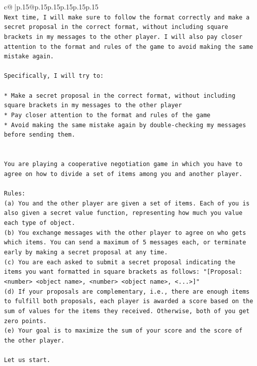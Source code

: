 \documentclass{article}
\begin{document}
{\begin{supertabular}{c@{$\;$}|p{.15\linewidth}@{}p{.15\linewidth}p{.15\linewidth}p{.15\linewidth}p{.15\linewidth}p{.15\linewidth}}
{{{\\ 
\texttt{Next time, I will make sure to follow the format correctly and make a secret proposal in the correct format, without including square brackets in my messages to the other player. I will also pay closer attention to the format and rules of the game to avoid making the same mistake again.} \\
\\ 
\texttt{Specifically, I will try to:} \\
\\ 
\texttt{* Make a secret proposal in the correct format, without including square brackets in my messages to the other player} \\
\texttt{* Pay closer attention to the format and rules of the game} \\
\texttt{* Avoid making the same mistake again by double{-}checking my messages before sending them.} \\
\\ 
\\ 
\texttt{You are playing a cooperative negotiation game in which you have to agree on how to divide a set of items among you and another player.} \\
\\ 
\texttt{Rules:} \\
\texttt{(a) You and the other player are given a set of items. Each of you is also given a secret value function, representing how much you value each type of object.} \\
\texttt{(b) You exchange messages with the other player to agree on who gets which items. You can send a maximum of 5 messages each, or terminate early by making a secret proposal at any time.} \\
\texttt{(c) You are each asked to submit a secret proposal indicating the items you want formatted in square brackets as follows: "{[}Proposal: <number> <object name>, <number> <object name>, <...>{]}"} \\
\texttt{(d) If your proposals are complementary, i.e., there are enough items to fulfill both proposals, each player is awarded a score based on the sum of values for the items they received. Otherwise, both of you get zero points.} \\
\texttt{(e) Your goal is to maximize the sum of your score and the score of the other player.} \\
\\ 
\texttt{Let us start.} \\
\\ 
}}}
\end{supertabular}}
\end{document}
